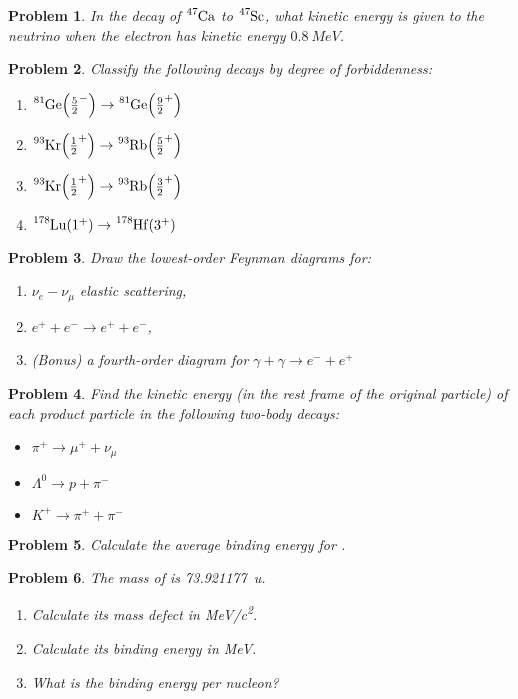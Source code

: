 \documentclass{article}
\newtheorem{plm}{Problem}
\begin{document}
\begin{plm}
  In the decay of $\ce{^{47}Ca}$ to $\ce{^{47}Sc}$, what kinetic energy is given to the neutrino when the electron
  has kinetic energy $\SI{0.8}{MeV}$.
\end{plm}
\begin{plm}
  Classify the following decays by degree of forbiddenness:
  \begin{enumerate}
  \item $\ce{^{81}Ge}\qty(\frac{5}{2}^{-}) \to \ce{^{81}Ge}\qty(\frac{9}{2}^{+})$
  \item $\ce{^{93}Kr}\qty(\frac{1}{2}^{+}) \to \ce{^{93}Rb}\qty(\frac{5}{2}^{+})$
  \item $\ce{^{93}Kr}\qty(\frac{1}{2}^{+}) \to \ce{^{93}Rb}\qty(\frac{3}{2}^{+})$
  \item $\ce{^{178}Lu}\qty(1^{+}) \to \ce{^{178}Hf}\qty(3^{+})$
  \end{enumerate}
\end{plm}
\begin{plm}
  Draw the lowest-order Feynman diagrams for:
  \begin{enumerate}
  \item $\nu_{e}-\nu_{\mu}$ elastic scattering,
  \item $e^{+} + e^{-} \to e^{+} + e^{-}$,
  \item (Bonus) a fourth-order diagram for $\gamma + \gamma \to e^{-} + e^{+}$
  \end{enumerate}
\end{plm}
\begin{plm}
  Find the kinetic energy (in the rest frame of the original particle) of each product particle in the following two-body decays:
  \begin{itemize}
  \item $\pi^{+} \to \mu^{+} + \nu_{\mu}$
  \item $\Lambda^{0} \to p + \pi^{-}$
  \item $K^{+} \to \pi^{+} + \pi^{-}$
  \end{itemize}
\end{plm}
\begin{plm}
  Calculate the average binding energy for .
\end{plm}
\begin{plm}
  The mass of  is \SI{73.921177}{u}.
  \begin{enumerate}
  \item Calculate its mass defect in \si{MeV/c^2}.
  \item Calculate its binding energy in \si{MeV}.
  \item What is the binding energy per nucleon?
  \end{enumerate}
\end{plm}
\end{document}
